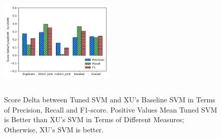 \documentclass[sigconf]{acmart}
\theoremstyle{break}
\begin{document}
 \begin{figure}[!t]
    \centering
     \includegraphics[width=0.49\textwidth,height=2.1in]{pic/TunedSVM-SVM.pdf} %
    \caption{Score Delta between Tuned SVM and XU's Baseline SVM in Terms of Precision, Recall and F1-score. Positive Values Mean
            Tuned SVM is Better than XU's SVM in Terms of Different Measures; Otherwise, XU's SVM is better.}
    \label{fig:TunedSVM-SVM}
\end{figure}

 
 
\end{document}

